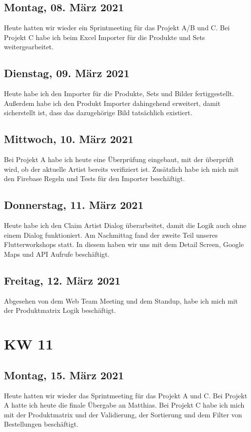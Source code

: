 \section{Montag, 08. März 2021}
Heute hatten wir wieder ein Sprintmeeting für das Projekt A/B und C. Bei Projekt C habe ich beim Excel Importer für die Produkte und Sets weitergearbeitet.

\section{Dienstag, 09. März 2021}
Heute habe ich den Importer für die Produkte, Sets und Bilder fertiggestellt. Außerdem habe ich den Produkt Importer dahingehend erweitert, damit sicherstellt ist, dass das dazugehörige Bild tatsächlich existiert.

\section{Mittwoch, 10. März 2021}
Bei Projekt A habe ich heute eine Überprüfung eingebaut, mit der überprüft wird, ob der aktuelle Artist bereits verifiziert ist. Zusätzlich habe ich mich mit den Firebase Regeln und Tests für den Importer beschäftigt.

\section{Donnerstag, 11. März 2021}
Heute habe ich den Claim Artist Dialog überarbeitet, damit die Logik auch ohne einem Dialog funktioniert. Am Nachmittag fand der zweite Teil unseres Flutterworkshops statt. In diesem haben wir uns mit dem Detail Screen, Google Maps und API Aufrufe beschäftigt.

\section{Freitag, 12. März 2021}
Abgesehen von dem Web Team Meeting und dem Standup, habe ich mich mit der Produktmatrix Logik beschäftigt.


\chapter{KW 11}

\section{Montag, 15. März 2021}
Heute hatten wir wieder das Sprintmeeting für das Projekt A und C. Bei Projekt A hatte ich heute die finale Übergabe an Matthias. Bei Projekt C habe ich mich mit der Produktmatrix und der Validierung, der Sortierung und dem Filter von Bestellungen beschäftigt.

